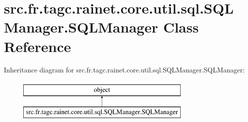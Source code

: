\hypertarget{classsrc_1_1fr_1_1tagc_1_1rainet_1_1core_1_1util_1_1sql_1_1SQLManager_1_1SQLManager}{\section{src.\-fr.\-tagc.\-rainet.\-core.\-util.\-sql.\-S\-Q\-L\-Manager.\-S\-Q\-L\-Manager Class Reference}
\label{classsrc_1_1fr_1_1tagc_1_1rainet_1_1core_1_1util_1_1sql_1_1SQLManager_1_1SQLManager}
}
Inheritance diagram for src.\-fr.\-tagc.\-rainet.\-core.\-util.\-sql.\-S\-Q\-L\-Manager.\-S\-Q\-L\-Manager\-:\begin{figure}[H]
\begin{center}
\leavevmode
\includegraphics[height=2.000000cm]{classsrc_1_1fr_1_1tagc_1_1rainet_1_1core_1_1util_1_1sql_1_1SQLManager_1_1SQLManager}
\end{center}
\end{figure}
